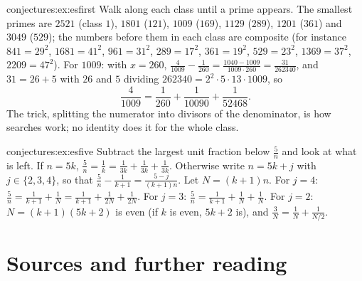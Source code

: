\begin{solution}{conjectures:ex:esfirst}
\idea Walk along each class until a prime appears.
\writeup The smallest primes are $2521$ (class $1$), $1801$ ($121$), $1009$ ($169$), $1129$ ($289$), $1201$ ($361$) and $3049$ ($529$); the numbers
before them in each class are composite (for instance $841=29^2$, $1681=41^2$, $961=31^2$, $289=17^2$, $361=19^2$, $529=23^2$, $1369=37^2$, $2209=47^2$).
For $1009$: with $x=260$, $\frac4{1009}-\frac1{260}=\frac{1040-1009}{1009\cdot260}=\frac{31}{262340}$, and $31=26+5$ with $26$ and $5$ dividing
$262340=2^2\cdot5\cdot13\cdot1009$, so
\[
\frac4{1009}=\frac1{260}+\frac1{10090}+\frac1{52468}.
\]
The trick, splitting the numerator into divisors of the denominator, is how searches work; no identity does it for the whole class.
\end{solution}

\begin{solution}{conjectures:ex:esfive}
\idea Subtract the largest unit fraction below $\frac5n$ and look at what is left.
\writeup If $n=5k$, $\frac5n=\frac1k=\frac1{3k}+\frac1{3k}+\frac1{3k}$. Otherwise write $n=5k+j$ with $j\in\{2,3,4\}$, so that
$\frac5n-\frac1{k+1}=\frac{5-j}{(k+1)n}$. Let $N=(k+1)n$. For $j=4$: $\frac5n=\frac1{k+1}+\frac1N=\frac1{k+1}+\frac1{2N}+\frac1{2N}$. For $j=3$:
$\frac5n=\frac1{k+1}+\frac1N+\frac1N$. For $j=2$: $N=(k+1)(5k+2)$ is even (if $k$ is even, $5k+2$ is), and $\frac3N=\frac1N+\frac1{N/2}$.
\end{solution}

\section*{Sources and further reading}

